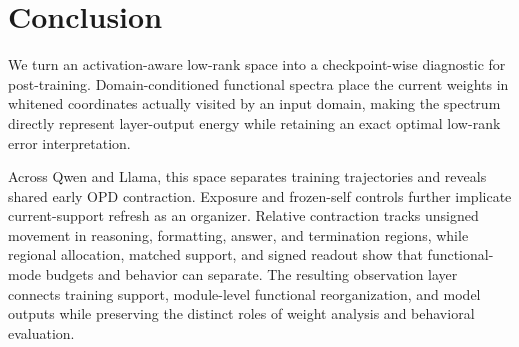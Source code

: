 \documentclass[letterpaper]{article} %
\begin{document}
\section{Conclusion}

We turn an activation-aware low-rank space into a checkpoint-wise diagnostic for post-training. Domain-conditioned functional spectra place the current weights in whitened coordinates actually visited by an input domain, making the spectrum directly represent layer-output energy while retaining an exact optimal low-rank error interpretation.

Across Qwen and Llama, this space separates training trajectories and reveals shared
early OPD contraction. Exposure and frozen-self controls further implicate current-support
refresh as an organizer. Relative contraction tracks unsigned movement in reasoning,
formatting, answer, and termination regions, while regional allocation, matched support,
and signed readout show that functional-mode budgets and behavior can separate. The
resulting observation layer connects training support, module-level functional
reorganization, and model outputs while preserving the distinct roles of weight analysis
and behavioral evaluation.


\end{document}
